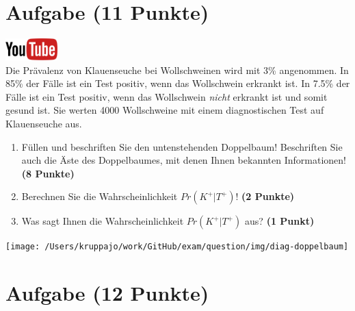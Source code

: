 \documentclass[a4paper, 10pt]{scrartcl}\usepackage[]{graphicx}\usepackage[]{xcolor}
\begin{document}
\clearpage

\section{Aufgabe \hfill (11 Punkte)}

\hfill\href{https://youtu.be/VQlNl8hvRII}{\includegraphics[width =
  2cm]{img/youtube}}\\[1Ex]


Die Pr{\"a}valenz von Klauenseuche bei Wollschweinen wird mit
3\% angenommen. In 85\% der F{\"a}lle ist ein Test positiv, wenn das Wollschwein erkrankt
ist. In 7.5\% der F{\"a}lle ist ein Test positiv,
wenn das Wollschwein \textit{nicht} erkrankt ist und somit gesund ist. Sie
werten 4000 Wollschweine mit einem
diagnostischen Test auf Klauenseuche aus.



\begin{enumerate}
\item F{\"u}llen und beschriften Sie den untenstehenden Doppelbaum! Beschriften
  Sie auch die {\"A}ste des Doppelbaumes, mit denen Ihnen bekannten
  Informationen!  \textbf{(8 Punkte)}
\item Berechnen Sie die Wahrscheinlichkeit $Pr(K^+|T^+)$! \textbf{(2 Punkte)}
\item Was sagt Ihnen die Wahrscheinlichkeit $Pr(K^+|T^+)$ aus? \textbf{(1 Punkt)}
\end{enumerate}

\vspace{1cm}

\begin{center}
  \texttt{[image: /Users/kruppajo/work/GitHub/exam/question/img/diag-doppelbaum]}
\end{center}



 
\clearpage

\section{Aufgabe \hfill (12 Punkte)}
\end{document}
